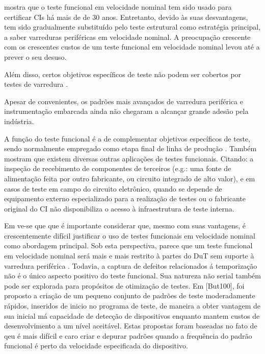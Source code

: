 \citet{thibeault2006} mostra que o teste funcional em velocidade nominal tem sido usado para certificar CIs há mais de de 30 anos. Entretanto, devido às suas desvantagens, tem sido gradualmente substituído pelo teste estrutural como estratégia principal, a saber varreduras periféricas em velocidade nominal. A preocupação crescente com os crescentes custos de um teste funcional em velocidade nominal levou até a prever o seu desuso. 

Além disso, certos objetivos específicos de teste não podem ser cobertos por testes de varredura \citep{thibeault2006}.

Apesar de convenientes, os padrões mais avançados de varredura periférica e instrumentação embarcada ainda não chegaram a alcançar grande adesão pela indústria. 

\citet{tumim2001}

A função do teste funcional é a de complementar objetivos específicos de teste, sendo normalmente empregado como etapa final de linha de produção \citep{jutman2014high}. Também mostram que existem diversas outras aplicações de testes funcionais. Citando: a inspeção de recebimento de componentes de terceiros (e.g.: uma fonte de alimentação feita por outro fabricante, ou circuito integrado de alto valor), e em casos de teste em campo do circuito eletrônico, quando se depende de equipamento externo especializado para a realização de testes ou o fabricante original do CI não disponibiliza o acesso à infraestrutura de teste interna.

Em \citep{thibeault2006} ve-se que que é importante considerar que, mesmo com suas vantagens, é crescentemente difícil justificar o uso de testes funcionais em velocidade nominal como abordagem principal. Sob esta perspectiva, parece que um teste funcional em velocidade nominal será mais e mais restrito à partes do DuT sem suporte à varredura periférica \citep{thibeault2006}. Todavia, a captura de defeitos relacionados á temporização não é o único aspecto positivo do teste funcional. Sua natureza não serial também pode ser explorada para propósitos de otimização de testes. Em [But100], foi proposto a criação de um pequeno conjunto de padrões de teste moderadamente rápidos, inseridos de inicio no programa de teste, de maneira a obter vantagem de sua inicial má capacidade de detecção de dispositivos enquanto mantem custos de desenvolvimento a um nível aceitável. Estas propostas foram baseadas no fato de qeu é mais difícil e caro criar e depurar padrões quando a frequência do  padrão funcional é perto da velocidade especificada do dispositivo.

